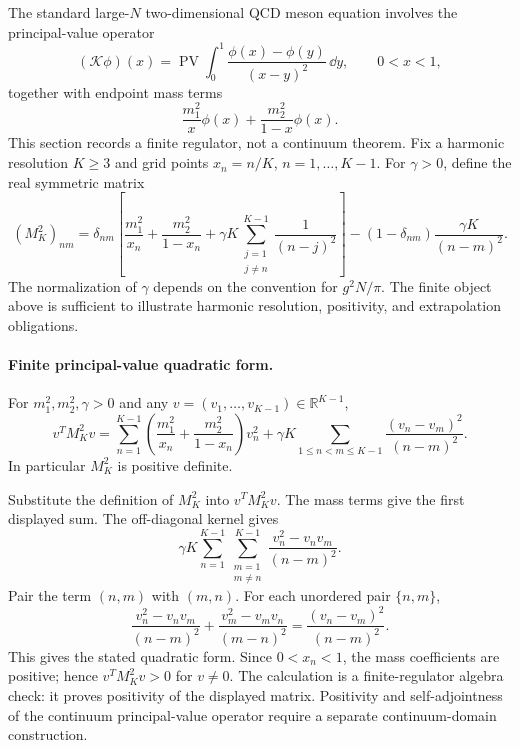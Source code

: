 The standard large-\(N\) two-dimensional QCD meson equation involves the
principal-value operator
\[
  (\mathcal K\phi)(x)
  =
  \operatorname{PV}\int_0^1
  \frac{\phi(x)-\phi(y)}{(x-y)^2}\,\dd y ,
  \qquad 0<x<1,
\]
together with endpoint mass terms
\[
  \frac{m_1^2}{x}\phi(x)+\frac{m_2^2}{1-x}\phi(x).
\]
This section records a finite regulator, not a continuum theorem.  Fix a
harmonic resolution \(K\geq3\) and grid points \(x_n=n/K\),
\(n=1,\ldots,K-1\).  For \(\gamma>0\), define the real symmetric matrix
\[
  (M_K^2)_{nm}
  =
  \delta_{nm}
  \left[
    \frac{m_1^2}{x_n}
    +
    \frac{m_2^2}{1-x_n}
    +
    \gamma K\sum_{\substack{j=1\\ j\neq n}}^{K-1}
      \frac1{(n-j)^2}
  \right]
  -
  (1-\delta_{nm})\frac{\gamma K}{(n-m)^2}.
\]
The normalization of \(\gamma\) depends on the convention for
\(g^2N/\pi\).  The finite object above is sufficient to illustrate harmonic
resolution, positivity, and extrapolation obligations.

\paragraph{Finite principal-value quadratic form.}
For \(m_1^2,m_2^2,\gamma>0\) and any
\(v=(v_1,\ldots,v_{K-1})\in\mathbb R^{K-1}\),
\begin{equation}
  v^T M_K^2 v
  =
  \sum_{n=1}^{K-1}
  \left(
    \frac{m_1^2}{x_n}
    +
    \frac{m_2^2}{1-x_n}
  \right)v_n^2
  +
  \gamma K
  \sum_{1\leq n<m\leq K-1}
  \frac{(v_n-v_m)^2}{(n-m)^2}.
  \label{eq:thooft-dlcq-finite-quadratic-form}
\end{equation}
In particular \(M_K^2\) is positive definite.

Substitute the definition of \(M_K^2\) into \(v^TM_K^2v\).  The mass terms
give the first displayed sum.  The off-diagonal kernel gives
\[
  \gamma K
  \sum_{n=1}^{K-1}
  \sum_{\substack{m=1\\m\neq n}}^{K-1}
  \frac{v_n^2-v_nv_m}{(n-m)^2}.
\]
Pair the term \((n,m)\) with \((m,n)\).  For each unordered pair
\(\{n,m\}\),
\[
  \frac{v_n^2-v_nv_m}{(n-m)^2}
  +
  \frac{v_m^2-v_mv_n}{(m-n)^2}
  =
  \frac{(v_n-v_m)^2}{(n-m)^2}.
\]
This gives the stated quadratic form.  Since \(0<x_n<1\), the mass
coefficients are positive; hence \(v^TM_K^2v>0\) for \(v\neq0\).
The calculation is a finite-regulator algebra check: it proves positivity of
the displayed matrix.  Positivity and self-adjointness of the continuum
principal-value operator require a separate continuum-domain construction.

